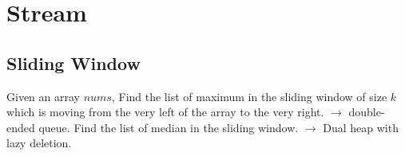 \chapter{Stream}
\section{Sliding Window}
 Given an array $nums$, Find the list of maximum in the sliding window of size $k$ which is moving from the very left of the array to the very right. $\rightarrow$ double-ended queue.
 Find the list of median in the sliding window. $\rightarrow$ Dual heap with lazy deletion.
